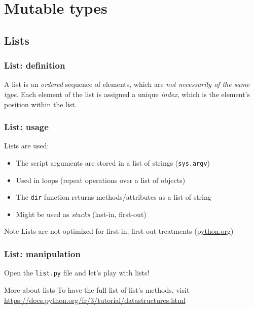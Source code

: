 \section{Mutable types}
\subsection{Lists}

\begin{frame}[fragile]
    \frametitle{List: definition}
    A list is an \emph{ordered} sequence of elements, which are \emph{not necessarily of the same type}. Each element of the list is assigned a unique \emph{index}, which is the element's position within the list.
   
    


\end{frame}

\begin{frame}[fragile]
    \frametitle{List: usage}
    
    Lists are used: 
    \begin{itemize}
        \item{The script arguments are stored in a list of strings (\verb+sys.argv+)}
        \item{Used in loops (repeat operations over a list of objects)}
        \item{The \verb+dir+ function returns methods/attributes as a list of string}
        \item{Might be used as \emph{stacks} (last-in, first-out)}
    \end{itemize}

    \begin{block}{Note}
        Lists are not optimized for first-in, first-out treatments (\href{https://docs.python.org/fr/3/tutorial/datastructures.html}{python.org})
    \end{block}
\end{frame}

\begin{frame}[fragile]
    \frametitle{List: manipulation}
    Open the \verb+list.py+ file and let's play with lists!

    \begin{block}{More about lists}
        To have the full list of list's methods, visit \url{https://docs.python.org/fr/3/tutorial/datastructures.html}
    \end{block}

\end{frame}

